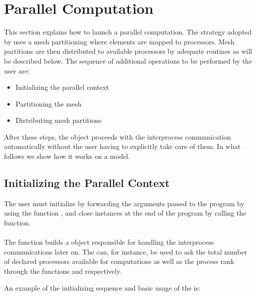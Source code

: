 \chapter{Parallel Computation}

This section explains how to launch a parallel computation.
The strategy adopted by \akantu uses a mesh partitioning
where elements are mapped to processors. Mesh partitions are
then distributed to available processors by adequate routines
as will be described below.
The sequence of additional operations to be performed by the user are:

\begin{itemize}
\item Initializing the parallel context
\item Partitioning the mesh
\item Distributing mesh partitions
\end{itemize}

After these steps, the 
object proceeds with the interprocess communication automatically
without the user having to explicitly take care of them.
In what follows we show how it works on a  model.

\section{Initializing the Parallel Context}

The user must initialize \akantu by forwarding the arguments passed to the
program by using the function , and close \akantu instances
at the end of the program by calling the  function.\\

\\

The  function builds a  object
responsible for handling the interprocess communications later on.  The
 can, for instance, be used to ask the total number of
declared processors available for computations as well as the process rank
through the functions  and  respectively.

An example of the initializing sequence and basic usage of the
 is:

